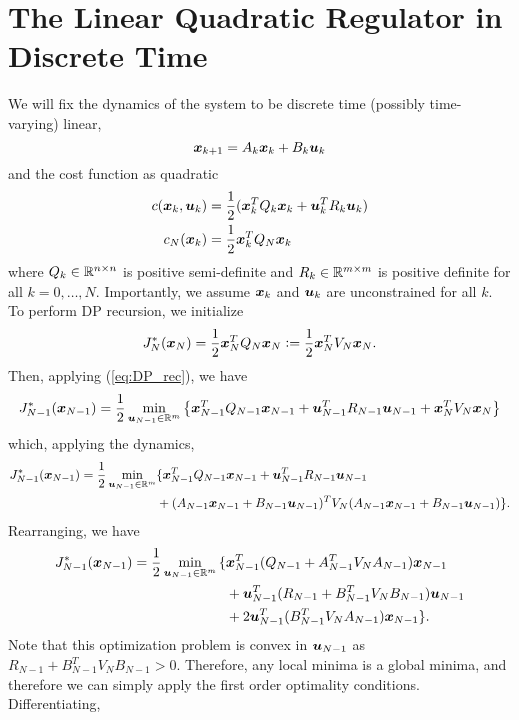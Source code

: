 \section{The Linear Quadratic Regulator in Discrete Time}
\label{sec:disrete_LQR}
We will fix the dynamics of the system to be discrete time (possibly time-varying) linear, 
\begin{equation}
    \bm{x}_{k+1} = A_k \bm{x}_k + B_k \bm{u}_k
\end{equation}
and the cost function as quadratic
\begin{align}
    c(\bm{x}_k, \bm{u}_k) &= \frac{1}{2} ( \bm{x}_k^T Q_k \bm{x}_k + \bm{u}_k^T R_k \bm{u}_k )\\
    c_N(\bm{x}_k) &= \frac{1}{2} \bm{x}_k^T Q_N \bm{x}_k
\end{align}
where $Q_k \in \mathbb{R}^{n \times n}$ is positive semi-definite and $R_k \in \mathbb{R}^{m \times m}$ is positive definite for all $k = 0, \ldots, N$. Importantly, we assume $\bm{x}_k$ and $\bm{u}_k$ are unconstrained for all $k$. To perform DP recursion, we initialize 
\begin{equation}
    J_N^*(\bm{x}_N) = \frac{1}{2} \bm{x}_N^T Q_N \bm{x}_N \vcentcolon= \frac{1}{2} \bm{x}_N^T V_N \bm{x}_N.
\end{equation}
Then, applying (\ref{eq:DP_rec}), we have
\begin{equation}
    J_{N-1}^*(\bm{x}_{N-1}) = \frac{1}{2} \min_{\bm{u}_{N-1} \in \mathbb{R}^m} \left\{ \bm{x}_{N-1}^T Q_{N-1} \bm{x}_{N-1} + \bm{u}_{N-1}^T R_{N-1} \bm{u}_{N-1} + \bm{x}_N^T V_N \bm{x}_N \right\}
\end{equation}
which, applying the dynamics,
\begin{align}
\label{eq:LQR_rec_cost}
    J_{N-1}^*(\bm{x}_{N-1}) = \frac{1}{2} \min_{\bm{u}_{N-1} \in \mathbb{R}^m} & {\large\{} \bm{x}_{N-1}^T Q_{N-1} \bm{x}_{N-1} + \bm{u}_{N-1}^T R_{N-1} \bm{u}_{N-1}\\
    &+ (A_{N-1} \bm{x}_{N-1} + B_{N-1} \bm{u}_{N-1})^T V_N (A_{N-1} \bm{x}_{N-1} + B_{N-1} \bm{u}_{N-1}) {\large\}}. \nonumber
\end{align}
Rearranging, we have
\begin{align}
    J_{N-1}^*(\bm{x}_{N-1}) = \frac{1}{2} \min_{\bm{u}_{N-1} \in \mathbb{R}^m} {\large\{}
    & \bm{x}_{N-1}^T (Q_{N-1} + A_{N-1}^T V_N A_{N-1}) \bm{x}_{N-1}\\ \nonumber
    & + \bm{u}_{N-1}^T (R_{N-1} + B_{N-1}^T V_N B_{N-1}) \bm{u}_{N-1}\\\nonumber
    & + 2 \bm{u}_{N-1}^T (B_{N-1}^T V_N A_{N-1}) \bm{x}_{N-1} \nonumber
    {\large\}}.
\end{align}
Note that this optimization problem is convex in $\bm{u}_{N-1}$ as $R_{N-1} + B_{N-1}^T V_N B_{N-1} > 0$. Therefore, any local minima is a global minima, and therefore we can simply apply the first order optimality conditions. Differentiating,
